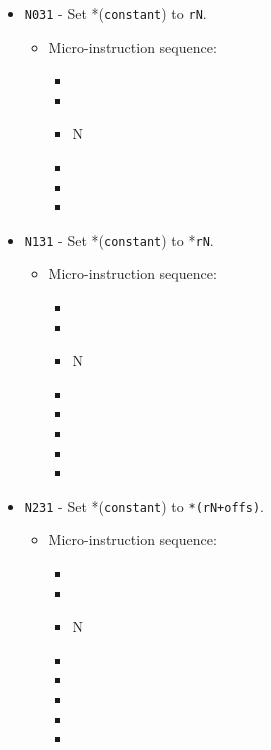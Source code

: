 \documentclass{article}
\begin{document}
\begin{itemize}
    \item \Verb|N031| - Set *(\Verb|constant|) to \Verb|rN|.
    \begin{itemize}
        \item Micro-instruction sequence:
        \begin{itemize}
            \item \pkptroutinc
            \item \holddataaddr
            \item \regtodata N
            \item \writeRAM
            \item \incrementpk
            \item \done
        \end{itemize}
    \end{itemize}

    \item \Verb|N131| - Set *(\Verb|constant|) to *\Verb|rN|.
    \begin{itemize}
        \item Micro-instruction sequence:
        \begin{itemize}
            \item \pkptroutinc
            \item \datatotmpa
            \item \regptodata N
            \item \holddata
            \item \tmpatoaddr
            \item \writeRAM
            \item \incrementpk
            \item \done
        \end{itemize}
    \end{itemize}
    
    \item \Verb|N231| - Set *(\Verb|constant|) to \Verb|*(rN+offs)|.
    \begin{itemize}
        \item Micro-instruction sequence:
        \begin{itemize}
            \item \pkptroutinc
            \item \datatotmpa
            \item \regptodata N
            \item \holddata
            \item \tmpatoaddr
            \item \writeRAM
            \item \incrementpk
            \item \done
        \end{itemize}
    \end{itemize}
    

\end{itemize}
\end{document}
